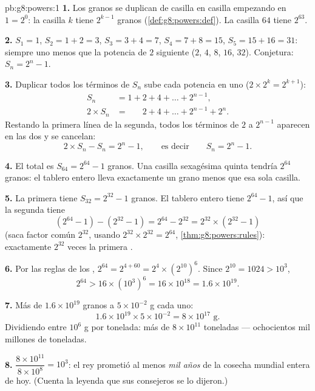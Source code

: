 \begin{solution}{pb:g8:powers:1}
\textbf{1.} Los granos se duplican de casilla en casilla empezando en
$1 = 2^0$: la casilla $k$ tiene $2^{k-1}$ granos
(\cref{def:g8:powers:def}). La casilla $64$ tiene $2^{63}$.

\textbf{2.} $S_1 = 1$, $S_2 = 1 + 2 = 3$, $S_3 = 3 + 4 = 7$,
$S_4 = 7 + 8 = 15$, $S_5 = 15 + 16 = 31$: siempre uno menos que
la potencia de $2$ siguiente ($2$, $4$, $8$, $16$, $32$). Conjetura:
$S_n = 2^n - 1$.

\textbf{3.} Duplicar todos los términos de $S_n$ sube cada potencia en
uno ($2 \times 2^{k} = 2^{k+1}$):
\begin{align*}
S_n &= 1 + 2 + 4 + \dots + 2^{n-1}, \\
2 \times S_n &= \phantom{1 + {}} 2 + 4 + \dots + 2^{n-1} + 2^n .
\end{align*}
Restando la primera línea de la segunda, todos los términos de $2$
a $2^{n-1}$ aparecen en las dos y se cancelan:
\[
2 \times S_n - S_n = 2^n - 1,
\qquad\text{es decir}\qquad
S_n = 2^n - 1 .
\]

\textbf{4.} El total es $S_{64} = 2^{64} - 1$ granos. Una
casilla sexagésima quinta tendría $2^{64}$ granos: el tablero entero
lleva exactamente un grano menos que esa sola casilla.

\textbf{5.} La primera  tiene $S_{32} = 2^{32} - 1$ granos.
El tablero entero tiene $2^{64} - 1$, así que la segunda  tiene
\[
\left(2^{64} - 1\right) - \left(2^{32} - 1\right)
= 2^{64} - 2^{32}
= 2^{32} \times \left(2^{32} - 1\right)
\]
(saca factor común $2^{32}$, usando $2^{32} \times 2^{32} = 2^{64}$,
\cref{thm:g8:powers:rules}): exactamente $2^{32}$ veces la primera
.

\textbf{6.} Por las reglas de los , $2^{64} = 2^{4 + 60} =
2^4 \times \left(2^{10}\right)^6$. Since $2^{10} = 1024 > 10^3$,
\[
2^{64} > 16 \times \left(10^3\right)^6 = 16 \times 10^{18}
= 1.6 \times 10^{19} .
\]

\textbf{7.} Más de $1.6 \times 10^{19}$ granos a
$5 \times 10^{-2}$ g cada uno:
\[
1.6 \times 10^{19} \times 5 \times 10^{-2}
= 8 \times 10^{17} \text{ g} .
\]
Dividiendo entre $10^6$ g por tonelada: más de $8 \times 10^{11}$
toneladas --- ochocientos mil millones de toneladas.

\textbf{8.} $\dfrac{8 \times 10^{11}}{8 \times 10^{8}} = 10^3$:
el rey prometió al menos \emph{mil años} de la cosecha
mundial entera de hoy. (Cuenta la leyenda que sus consejeros se lo
dijeron.)


\end{solution}
